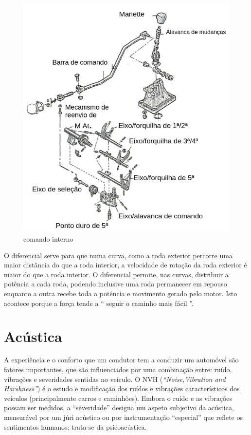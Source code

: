 \begin{figure}[H]
\centering
\includegraphics[scale=0.4]{figs/comando_interno}
\caption{comando interno}\label{comando interno}
\end{figure}

O diferencial serve para que numa curva, como a roda exterior percorre uma maior distância do que a roda interior, a velocidade de rotação da roda exterior é maior do que a roda interior. O diferencial permite, nas curvas, distribuir a potência a cada roda, podendo inclusive uma roda permanecer em repouso enquanto a outra recebe toda a potência e movimento gerado pelo motor. Isto acontece porque a força tende a “ seguir o caminho mais fácil ”.


\section{Acústica}

A experiência e o conforto que um condutor tem a conduzir um automóvel são fatores importantes, que são influenciados por uma combinação entre: ruído, vibrações e severidades sentidas no veículo. O NVH (\textit{``Noise,Vibration and Harshness''}) é o estudo e modificação dos ruídos e vibrações característicos dos veículos (principalmente carros e caminhões). Embora o ruído e as vibrações possam ser medidos, a ``severidade'' designa um aspeto subjetivo da acústica, mensurável por um júri acústico ou por instrumentação ``especial'' que reflete os sentimentos humanos: trata-se da psicoacústica.

